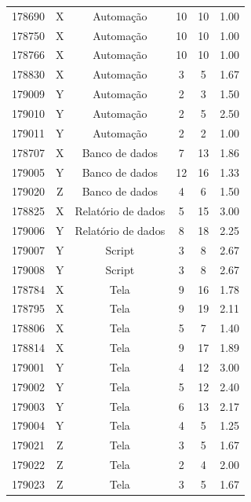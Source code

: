 \begin{longtable}{cccccc}
		178690 & X & Automação & 10 & 10 & 1.00 \\
		178750 & X & Automação & 10 & 10 & 1.00 \\
		178766 & X & Automação & 10 & 10 & 1.00 \\
		178830 & X & Automação & 3 & 5 & 1.67 \\
		179009 & Y & Automação & 2 & 3 & 1.50 \\
		179010 & Y & Automação & 2 & 5 & 2.50 \\
		179011 & Y & Automação & 2 & 2 & 1.00 \\
		178707 & X & Banco de dados & 7 & 13 & 1.86 \\
		179005 & Y & Banco de dados & 12 & 16 & 1.33 \\
		179020 & Z & Banco de dados & 4 & 6 & 1.50 \\
		178825 & X & Relatório de dados & 5 & 15 & 3.00 \\
		179006 & Y & Relatório de dados & 8 & 18 & 2.25 \\
		179007 & Y & Script & 3 & 8 & 2.67 \\
		179008 & Y & Script & 3 & 8 & 2.67 \\
		178784 & X & Tela & 9 & 16 & 1.78 \\
		178795 & X & Tela & 9 & 19 & 2.11 \\
		178806 & X & Tela & 5 & 7 & 1.40 \\
		178814 & X & Tela & 9 & 17 & 1.89 \\
		179001 & Y & Tela & 4 & 12 & 3.00 \\
		179002 & Y & Tela & 5 & 12 & 2.40 \\
		179003 & Y & Tela & 6 & 13 & 2.17 \\
		179004 & Y & Tela & 4 & 5 & 1.25 \\
		179021 & Z & Tela & 3 & 5 & 1.67 \\
		179022 & Z & Tela & 2 & 4 & 2.00 \\
		179023 & Z & Tela & 3 & 5 & 1.67 \\
	\end{longtable}


